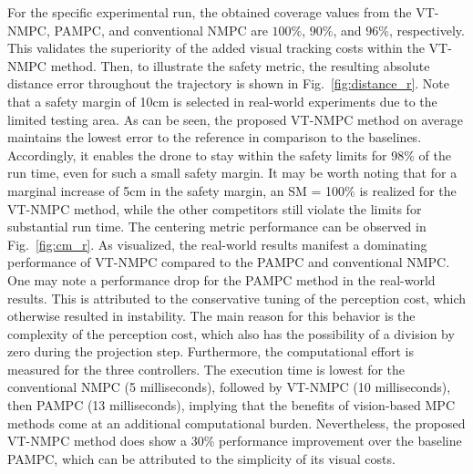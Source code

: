 \documentclass[letterpaper, 10 pt, conference]{ieeeconf}  %
\begin{document}
For the specific experimental run, the obtained coverage values from the VT-NMPC, PAMPC, and conventional NMPC are $100\%$, $90\%$, and $96\%$, respectively. This validates the superiority of the added visual tracking costs within the VT-NMPC method. Then, to illustrate the safety metric, the resulting absolute distance error throughout the trajectory is shown in Fig.~{\ref{fig:distance_r}}. Note that a safety margin of 10cm is selected in real-world experiments due to the limited testing area. As can be seen, the proposed VT-NMPC method on average maintains the lowest error to the reference in comparison to the baselines. Accordingly, it enables the drone to stay within the safety limits for 98\% of the run time, even for such a small safety margin. It may be worth noting that for a marginal increase of 5cm in the safety margin, an SM = 100\% is realized for the VT-NMPC method, while the other competitors still violate the limits for substantial run time. The centering metric performance can be observed in Fig.~{\ref{fig:cm_r}}. As visualized, the real-world results manifest a dominating performance of VT-NMPC compared to the PAMPC and conventional NMPC. One may note a performance drop for the PAMPC method in the real-world results. This is attributed to the conservative tuning of the perception cost, which otherwise resulted in instability. The main reason for this behavior is the complexity of the perception cost, which also has the possibility of a division by zero during the projection step. Furthermore, the computational effort is measured for the three controllers. The execution time is lowest for the conventional NMPC (5 milliseconds), followed by VT-NMPC (10 milliseconds), then PAMPC (13 milliseconds), implying that the benefits of vision-based MPC methods come at an additional computational burden. Nevertheless, the proposed VT-NMPC method does show a 30\% performance improvement over the baseline PAMPC, which can be attributed to the simplicity of its visual costs. 










\end{document}
